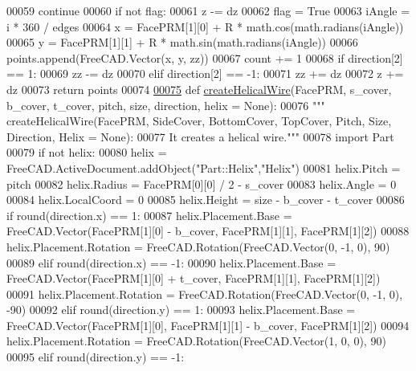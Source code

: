 \begin{DoxyCode}
00059                     \textcolor{keywordflow}{continue}
00060                 \textcolor{keywordflow}{if} \textcolor{keywordflow}{not} flag:
00061                     z -= dz
00062                     flag = \textcolor{keyword}{True}
00063                 iAngle = i * 360 / edges
00064                 x =  FacePRM[1][0] + R * math.cos(math.radians(iAngle))
00065                 y =  FacePRM[1][1] + R * math.sin(math.radians(iAngle))
00066                 points.append(FreeCAD.Vector(x, y, zz))
00067                 count += 1
00068                 \textcolor{keywordflow}{if} direction[2] == 1:
00069                     zz -= dz
00070                 \textcolor{keywordflow}{elif} direction[2] == -1:
00071                     zz += dz
00072                 z += dz
00073     \textcolor{keywordflow}{return} points
00074 
\hypertarget{HelicalRebar_8py_source.tex_l00075}{}\hyperlink{namespaceHelicalRebar_a1a2b3ce39b904ab0c3892ed0965d2844}{00075} \textcolor{keyword}{def }\hyperlink{namespaceHelicalRebar_a1a2b3ce39b904ab0c3892ed0965d2844}{createHelicalWire}(FacePRM, s\_cover, b\_cover, t\_cover, pitch, size, direction, helix = 
      None):
00076     \textcolor{stringliteral}{""" createHelicalWire(FacePRM, SideCover, BottomCover, TopCover, Pitch, Size, Direction, Helix = None):}
00077 \textcolor{stringliteral}{    It creates a helical wire."""}
00078     \textcolor{keyword}{import} Part
00079     \textcolor{keywordflow}{if} \textcolor{keywordflow}{not} helix:
00080         helix = FreeCAD.ActiveDocument.addObject(\textcolor{stringliteral}{"Part::Helix"},\textcolor{stringliteral}{"Helix"})
00081     helix.Pitch = pitch
00082     helix.Radius = FacePRM[0][0] / 2 - s\_cover
00083     helix.Angle = 0
00084     helix.LocalCoord = 0
00085     helix.Height = size - b\_cover - t\_cover
00086     \textcolor{keywordflow}{if} round(direction.x) == 1:
00087         helix.Placement.Base = FreeCAD.Vector(FacePRM[1][0] - b\_cover, FacePRM[1][1], FacePRM[1][2])
00088         helix.Placement.Rotation = FreeCAD.Rotation(FreeCAD.Vector(0, -1, 0), 90)
00089     \textcolor{keywordflow}{elif} round(direction.x) == -1:
00090         helix.Placement.Base = FreeCAD.Vector(FacePRM[1][0] + t\_cover, FacePRM[1][1], FacePRM[1][2])
00091         helix.Placement.Rotation = FreeCAD.Rotation(FreeCAD.Vector(0, -1, 0), -90)
00092     \textcolor{keywordflow}{elif} round(direction.y) == 1:
00093         helix.Placement.Base = FreeCAD.Vector(FacePRM[1][0], FacePRM[1][1] - b\_cover, FacePRM[1][2])
00094         helix.Placement.Rotation = FreeCAD.Rotation(FreeCAD.Vector(1, 0, 0), 90)
00095     \textcolor{keywordflow}{elif} round(direction.y) == -1:

\end{DoxyCode}
